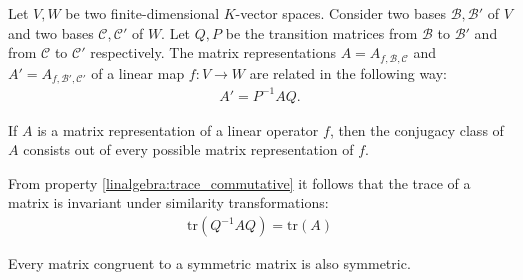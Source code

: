 	\begin{property}\label{linalgebra:theorem:transition_matrix_representation}
        	Let $V,W$ be two finite-dimensional $K$-vector spaces. Consider two bases $\mathcal{B}, \mathcal{B}'$ of $V$ and two bases $\mathcal{C}, \mathcal{C}'$ of $W$. Let $Q, P$ be the transition matrices from $\mathcal{B}$ to $\mathcal{B}'$ and from $\mathcal{C}$ to $\mathcal{C}'$ respectively. The matrix representations $A=A_{f, \mathcal{B}, \mathcal{C}}$ and $A' = A_{f, \mathcal{B}', \mathcal{C}'}$ of a linear map $f:V\rightarrow W$ are related in the following way:
	        \begin{gather}
        	    	A' = P^{-1}AQ.
        	\end{gather}
	\end{property}

        \begin{remark}
        	If $A$ is a matrix representation of a linear operator $f$, then the conjugacy class of $A$ consists out of every possible matrix representation of $f$.
        \end{remark}

        \begin{property}[Trace]
        	From property \ref{linalgebra:trace_commutative} it follows that the trace of a matrix is invariant under similarity transformations:
        	\begin{gather}
            		\label{linalgebra:trace_invariance}
            		\text{tr}(Q^{-1}AQ) = \text{tr}(A)
	        \end{gather}
        \end{property}

        \begin{property}
        	Every matrix congruent to a symmetric matrix is also symmetric.
        \end{property}

